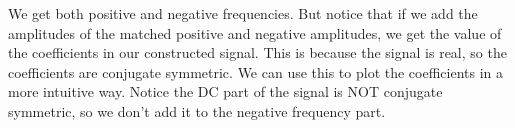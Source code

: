 We get both positive and negative frequencies. But notice that if we add
the amplitudes of the matched positive and negative amplitudes, we get
the value of the coefficients in our constructed signal. This is because
the signal is real, so the coefficients are conjugate symmetric. We can
use this to plot the coefficients in a more intuitive way. Notice the DC
part of the signal is NOT conjugate symmetric, so we don't add it to the
negative frequency part.

\begin{Shaded}
\begin{Highlighting}[]
\OperatorTok{=}\NormalTok{(}\NormalTok{, }\NormalTok{))}

\OperatorTok{=}\NormalTok{ np.insert(freqs[N}\OperatorTok{+}\NormalTok{:], }
\OperatorTok{=}\OperatorTok{*}\NormalTok{(cn[N}\OperatorTok{+}\NormalTok{:]), }

\NormalTok{)}

\NormalTok{)}
\NormalTok{)}
\NormalTok{)}

\OperatorTok{=}\OperatorTok{=}\OperatorTok{=}\StringTok{\textquotesingle{}{-}{-}\textquotesingle{}}\OperatorTok{=}\NormalTok{)}
\OperatorTok{=}\OperatorTok{=}\OperatorTok{=}\StringTok{\textquotesingle{}{-}{-}\textquotesingle{}}\OperatorTok{=}\NormalTok{)}
\NormalTok{,}\NormalTok{,}\NormalTok{))}

\end{Highlighting}
\end{Shaded}

